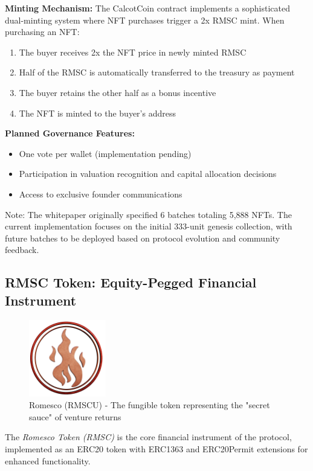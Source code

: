 \documentclass[conference]{IEEEtran}
\begin{document}
\textbf{Minting Mechanism:}
The CalcotCoin contract implements a sophisticated dual-minting system where NFT purchases trigger a 2x RMSC mint. When purchasing an NFT:
\begin{enumerate}
    \item The buyer receives 2x the NFT price in newly minted RMSC
    \item Half of the RMSC is automatically transferred to the treasury as payment
    \item The buyer retains the other half as a bonus incentive
    \item The NFT is minted to the buyer's address
\end{enumerate}

\textbf{Planned Governance Features:}
\begin{itemize}
    \item One vote per wallet (implementation pending)
    \item Participation in valuation recognition and capital allocation decisions
    \item Access to exclusive founder communications
\end{itemize}

Note: The whitepaper originally specified 6 batches totaling 5,888 NFTs. The current implementation focuses on the initial 333-unit genesis collection, with future batches to be deployed based on protocol evolution and community feedback.

\subsection{RMSC Token: Equity-Pegged Financial Instrument}

\begin{figure}[ht]
\centering
\includegraphics[width=0.3\textwidth]{rmsc_logo.png}
\caption{Romesco (RMSCU) - The fungible token representing the "secret sauce" of venture returns}
\label{fig:rmsc-logo}
\end{figure}

The \textit{Romesco Token (RMSC)} is the core financial instrument of the protocol, implemented as an ERC20 token with ERC1363 and ERC20Permit extensions for enhanced functionality.
\end{document}
